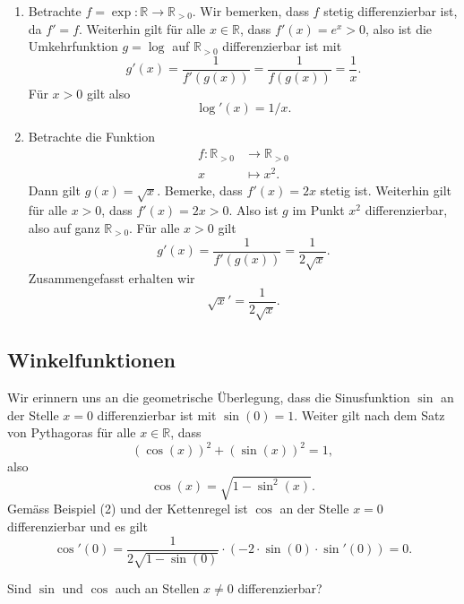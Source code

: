 \documentclass[../main.tex]{subfiles}
\begin{document}
\begin{examples}
  \leavevmode
  \begin{enumerate}[(1)]
    \item Betrachte $f = \exp \colon \mathbb{R} \to \mathbb{R}_{>0}$.
      Wir bemerken, dass $f$ stetig differenzierbar ist, da $f' = f$.
      Weiterhin gilt für alle $x \in \mathbb{R}$, dass
      $f'(x) = e^x > 0$, also ist die Umkehrfunktion $g = \log$ 
      auf $\mathbb{R}_{>0}$ differenzierbar ist mit
      \[
        g'(x) = \frac{1}{f'(g(x))} = \frac{1}{f(g(x))} = \frac{1}{x}.
      \]
      Für $x > 0$ gilt also
       \[
         \log'(x) = 1 / x.
      \]
    \item Betrachte die Funktion
      \begin{align*}
        f \colon \mathbb{R}_{> 0} & \to \mathbb{R}_{> 0} \\
        x & \mapsto x^2.
      \end{align*}
      Dann gilt $g(x) = \sqrt x$. Bemerke, dass
      $f'(x) = 2x$ stetig ist.
      Weiterhin gilt für alle $x > 0$, dass $f'(x) = 2 x > 0$.
      Also ist $g$ im Punkt $x^2$ differenzierbar,
      also auf ganz $\mathbb{R}_{>0}$. Für alle
      $x > 0$ gilt
      \[
        g'(x) = \frac{1}{f'(g(x))} = \frac{1}{2 \sqrt x}.
      \]
      Zusammengefasst erhalten wir
      \[
        \sqrt x ' = \frac{1}{2\sqrt x}.
      \]      
  \end{enumerate}
\end{examples}

\subsection*{Winkelfunktionen}
Wir erinnern uns an die geometrische Überlegung, dass
die Sinusfunktion
$\sin$ 
an der Stelle $x = 0$ differenzierbar ist mit
$\sin(0) = 1$. Weiter gilt nach dem Satz
von Pythagoras für alle $x \in \mathbb{R}$,
dass
\[
  {(\cos(x))}^2 + {(\sin(x))}^2 = 1,
\]
also 
\[
  \cos(x) = \sqrt{1 - \sin^2(x)}.
\]
Gemäss Beispiel (2) und der
Kettenregel ist $\cos$ an der
Stelle $x = 0$ differenzierbar
und es gilt
\[
  \cos ' ( 0 ) = 
  \frac{1}{2 \sqrt{1 - \sin(0)}} \cdot (-2 \cdot \sin(0) \cdot \sin'(0)) = 0.
\]

\begin{question}
  Sind $\sin$ und $\cos$ auch an Stellen $x \neq 0$
  differenzierbar?
\end{question}
\end{document}
